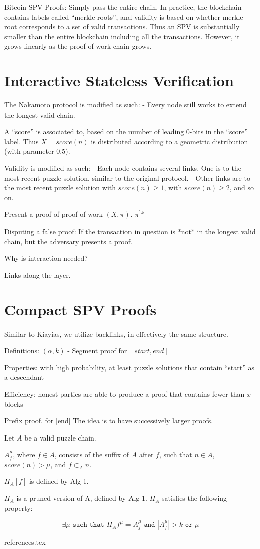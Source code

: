 \documentclass[11pt]{llncs}
\begin{document}
Bitcoin SPV Proofs:
	Simply pass the entire chain.
	In practice, the blockchain contains labels called “merkle roots”, and validity is based on whether merkle root corresponds to a set of valid transactions. Thus an SPV is substantially smaller than the entire blockchain including all the transactions. However, it grows linearly as the proof-of-work chain grows.

\section{Interactive Stateless Verification}

The Nakamoto protocol is modified as such:
- Every node still works to extend the longest valid chain.

A ``score'' is associated to, based on the number of leading 0-bits in the
``score'' label. Thus $X = score(n)$ is distributed according to a geometric distribution (with parameter 0.5).

Validity is modified as such:
- Each node contains several links. One is to the most recent puzzle solution, similar to the original protocol.
- Other links are to the most recent puzzle solution with $score(n) \geq
1$,  with $score(n) \geq 2$, and so on.

Present a proof-of-proof-of-work $(X, \pi)$. $\pi^{\rceil k}$

Disputing a false proof:
    If the transaction in question is *not* in the longest valid chain, but the adversary presents a proof.

Why is interaction needed?

Links along the layer.

\section{Compact SPV Proofs}

Similar to Kiayias, we utilize backlinks, in effectively the same structure.

Definitions:
$(\alpha, k)$ - Segment proof for $[start, end]$

Properties:
with high probability, at least puzzle solutions that contain ``start'' as a descendant

Efficiency:
	honest parties are able to produce a proof that contains fewer than $x$ blocks

Prefix proof.  for [end]
    The idea is to have successively larger proofs.

Let $A$ be a valid puzzle chain.

$A_{f}^{\mu}$, where $f \in A$, consists of the suffix of $A$ after
$f$, such that $n \in A$, $score(n) > \mu$, and $f \subset_A n$.

$\Pi_A[f]$  is defined by Alg 1.

$\Pi_{A}$ is a pruned version of A, defined by Alg 1.
$\Pi_{A}$ satisfies the following property:

\begin{equation*}
    \exists \mu \texttt{ such that } \Pi_{A}{f}^{\mu} = A_f^{\mu}
    \texttt{ and }
    |A_f^{\mu}| > k
    \texttt{ or } \mu
\end{equation*}

{references.tex}
\end{document}
